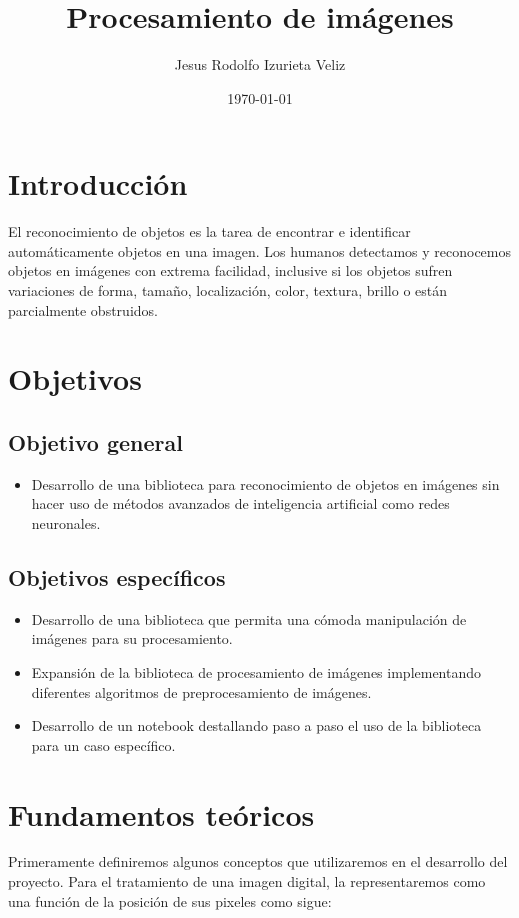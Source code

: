 \documentclass[letter]{article}
\author{Jesus Rodolfo Izurieta Veliz}
\date{\today}
\title{Procesamiento de imágenes}
\begin{document}
\maketitle

\section{Introducción}
\label{sec:orge532d11}
El reconocimiento de objetos es la tarea de encontrar e identificar
automáticamente objetos en una imagen. Los humanos detectamos y reconocemos
objetos en imágenes con extrema facilidad, inclusive si los objetos sufren
variaciones de forma, tamaño, localización, color, textura, brillo o están
parcialmente obstruidos.

\section{Objetivos}
\label{sec:orgec8fe82}
\subsection{Objetivo general}
\label{sec:orga3f3717}
\begin{itemize}
\item Desarrollo de una biblioteca para reconocimiento de objetos en imágenes sin
hacer uso de métodos avanzados de inteligencia artificial como redes
neuronales.
\end{itemize}

\subsection{Objetivos específicos}
\label{sec:orge13e107}
\begin{itemize}
\item Desarrollo de una biblioteca que permita una cómoda manipulación de imágenes
para su procesamiento.
\item Expansión de la biblioteca de procesamiento de imágenes implementando
diferentes algoritmos de preprocesamiento de imágenes.
\item Desarrollo de un notebook destallando paso a paso el uso de la biblioteca para
un caso específico.
\end{itemize}

\section{Fundamentos teóricos}
\label{sec:orgd8c807e}
Primeramente definiremos algunos conceptos que utilizaremos en el desarrollo del
proyecto. Para el tratamiento de una imagen digital, la representaremos como una
función de la posición de sus pixeles como sigue:
\end{document}
